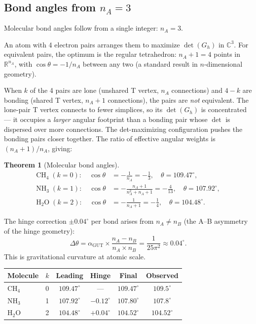 \documentclass[12pt]{article}
\newtheorem{theorem}{Theorem}[section]
\theoremstyle{remark}
\theoremstyle{definition}
\newcommand{\CC}{\mathbb{C}}
\begin{document}
\subsection{Bond angles from $n_A = 3$}

Molecular bond angles follow from a single integer: $n_A = 3$.

An atom with 4 electron pairs arranges them to maximize $\det(G_h)$ in $\CC^3$. For equivalent pairs, the optimum is the regular tetrahedron: $n_A + 1 = 4$ points in $\mathbb{R}^{n_A}$, with $\cos\theta = -1/n_A$ between any two (a standard result in $n$-dimensional geometry).

When $k$ of the 4 pairs are lone (unshared T vertex, $n_A$ connections) and $4-k$ are bonding (shared T vertex, $n_A + 1$ connections), the pairs are \emph{not} equivalent. The lone-pair T vertex connects to fewer simplices, so its $\det(G_h)$ is concentrated --- it occupies a \emph{larger} angular footprint than a bonding pair whose $\det$ is dispersed over more connections. The det-maximizing configuration pushes the bonding pairs closer together. The ratio of effective angular weights is $(n_A + 1)/n_A$, giving:

\begin{theorem}[Molecular bond angles]
\begin{align}
\text{CH}_4 \;(k=0): \quad \cos\theta &= -\frac{1}{n_A} = -\frac{1}{3}, \quad \theta = 109.47^\circ, \\[4pt]
\text{NH}_3 \;(k=1): \quad \cos\theta &= -\frac{n_A + 1}{n_A^2 + n_A + 1} = -\frac{4}{13}, \quad \theta = 107.92^\circ, \\[4pt]
\text{H}_2\text{O} \;(k=2): \quad \cos\theta &= -\frac{1}{n_A + 1} = -\frac{1}{4}, \quad \theta = 104.48^\circ.
\end{align}
\end{theorem}

The hinge correction $\pm 0.04^\circ$ per bond arises from $n_A \neq n_B$ (the A--B asymmetry of the hinge geometry):
\begin{equation}
\Delta\theta = \alpha_\text{GUT} \times \frac{n_A - n_B}{n_A \times n_B} = \frac{1}{25\pi^2} \approx 0.04^\circ.
\end{equation}
This is gravitational curvature at atomic scale.

\begin{center}
\begin{tabular}{lccccc}
\hline
Molecule & $k$ & Leading & Hinge & Final & Observed \\
\hline
CH$_4$ & 0 & $109.47^\circ$ & --- & $109.47^\circ$ & $109.5^\circ$ \\
NH$_3$ & 1 & $107.92^\circ$ & $-0.12^\circ$ & $107.80^\circ$ & $107.8^\circ$ \\
H$_2$O & 2 & $104.48^\circ$ & $+0.04^\circ$ & $104.52^\circ$ & $104.52^\circ$ \\
\hline
\end{tabular}
\end{center}
\end{document}
